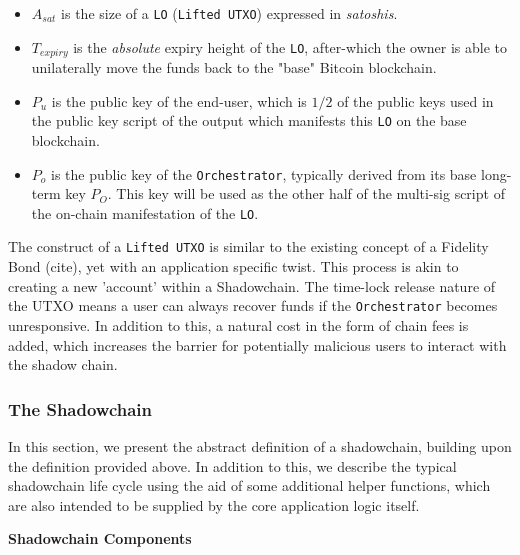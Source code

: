 \documentclass[10pt,a4paper]{article}
\theoremstyle{definition}
\begin{document}
\begin{itemize}
    \item $A_{sat}$ is the size of a \texttt{LO} (\texttt{Lifted UTXO})
        expressed in \emph{satoshis}.

    \item $T_{expiry}$ is the \emph{absolute} expiry height of the \texttt{LO},
        after-which the owner is able to unilaterally move the funds back to
        the "base" Bitcoin blockchain.

    \item $P_{u}$ is the public key of the end-user, which is $1/2$ of the
        public keys used in the public key script of the output which manifests
        this \texttt{LO} on the base blockchain.

    \item $P_{o}$ is the public key of the \texttt{Orchestrator}, typically
        derived from its base long-term key $P_O$. This key will be used as the
        other half of the multi-sig script of the on-chain manifestation of the
        \texttt{LO}.
\end{itemize}


The construct of a \texttt{Lifted UTXO} is similar to the existing concept of a
Fidelity Bond (cite), yet with an application specific twist. This process is
akin to creating a new 'account' within a Shadowchain. The time-lock release
nature of the UTXO means a user can always recover funds if the
\texttt{Orchestrator} becomes unresponsive. In addition to this, a natural cost
in the form of chain fees is added, which increases the barrier for potentially
malicious users to interact with the shadow chain.

\subsubsection{The Shadowchain}

In this section, we present the abstract definition of a shadowchain, building
upon the definition provided above. In addition to this, we describe the
typical shadowchain life cycle using the aid of some additional helper
functions, which are also intended to be supplied by the core application logic
itself.

\begin{center}
    \textbf{Shadowchain Components}
\end{center}
\end{document}
